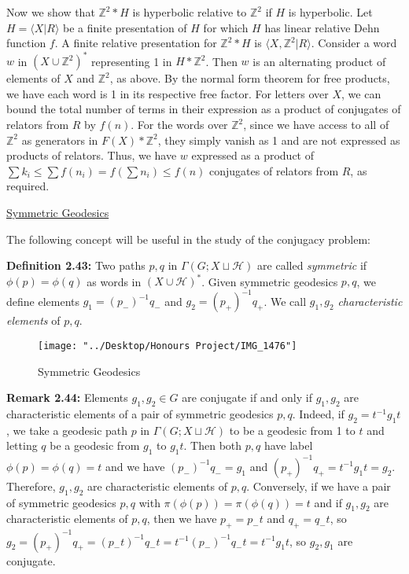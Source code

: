 \documentclass[12pt]{article}
\newcommand{\vs}{\vskip10pt}
\begin{document}
	\vs 
	
	Now we show that $\mathbb{Z}^2 * H$ is hyperbolic relative to $\mathbb{Z}^2$ if $H$ is hyperbolic. Let $H = \langle X \vert R \rangle$ be a finite presentation of $H$ for which $H$ has linear relative Dehn function $f$. A finite relative presentation for $\mathbb{Z}^2 * H$ is $\langle X, \mathbb{Z}^2 \vert R \rangle$. Consider a word $w$ in $(X \cup \mathbb{Z}^2)^*$ representing 1 in $H * \mathbb{Z}^2$. Then $w$ is an alternating product of elements of $X$ and $\mathbb{Z}^2$, as above. By the normal form theorem for free products, we have each word is 1 in its respective free factor. For letters over $X$, we can bound the total number of terms in their expression as a product of conjugates of relators from $R$ by $f(n)$. For the words over $\mathbb{Z}^2$, since we have access to all of $\mathbb{Z}^2$ as generators in $F(X) * \mathbb{Z}^2$, they simply vanish as 1 and are not expressed as products of relators. Thus, we have $w$ expressed as a product of $\sum k_i \leq \sum f(n_i) = f (\sum n_i) \leq f(n)$ conjugates of relators from $R$, as required. 
	
	\vs 
	
	\underline{Symmetric Geodesics}
	
	\vs 
	
	The following concept will be useful in the study of the conjugacy problem: 
	
	\vs 
	
	\textbf{Definition 2.43: } Two paths $p,q$ in $\Gamma(G; X \sqcup \mathcal{H})$ are called \textit{symmetric} if $\phi(p) = \phi(q)$ as words in $(X \cup \mathcal{H})^*$. Given symmetric geodesics $p,q$, we define elements $g_1 = (p_{-})^{-1} q_{-}$ and $g_2 = (p_{+})^{-1}q_{+}$. We call $g_1, g_2$ \textit{characteristic elements} of $p,q$.
	
\begin{figure} [H]
	\centering
	\texttt{[image: "../Desktop/Honours Project/IMG\_1476"]}
	\caption{Symmetric Geodesics}
	\label{fig:img1476}
\end{figure}
	
	\vs 
	
	\textbf{Remark 2.44: } Elements $g_1, g_2 \in G$ are conjugate if and only if $g_1, g_2$ are characteristic elements of a pair of symmetric geodesics $p,q$. Indeed, if $g_2 = t^{-1} g_1 t$, we take a geodesic path $p$ in $\Gamma(G; X \sqcup \mathcal{H})$ to be a geodesic from 1 to $t$ and letting $q$ be a geodesic from $g_1$ to $g_1 t$. Then both $p,q$ have label $\phi(p) = \phi(q) = t$ and we have $(p_{-})^{-1} q_{-} = g_1$ and $(p_{+})^{-1} q_{+} = t^{-1} g_1 t = g_2$. Therefore, $g_1, g_2$ are characteristic elements of $p,q$. Conversely, if we have a pair of symmetric geodesics $p,q$ with $\pi(\phi(p)) = \pi(\phi(q)) = t$ and if $g_1, g_2$ are characteristic elements of $p,q$, then we have $p_{+} = p_{-} t$ and $q_{+} = q_{-} t$, so $g_2 = (p_{+})^{-1}q_{+} = (p_{-} t)^{-1} q_{-} t = t^{-1} (p_{-})^{-1} q_{-} t = t^{-1} g_1 t$, so $g_2, g_1$ are conjugate.  
	
\end{document}
